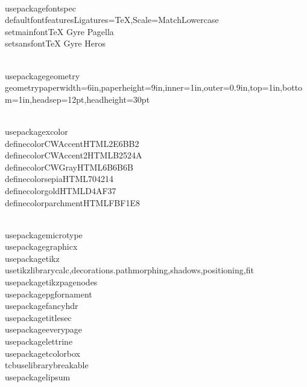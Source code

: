 
\\usepackage{fontspec}
\\defaultfontfeatures{Ligatures=TeX,Scale=MatchLowercase}
\\setmainfont{TeX Gyre Pagella}
\\setsansfont{TeX Gyre Heros}

\\usepackage{geometry}
\\geometry{paperwidth=6in,paperheight=9in,inner=1in,outer=0.9in,top=1in,bottom=1in,headsep=12pt,headheight=30pt}

\\usepackage{xcolor}
\\definecolor{CWAccent}{HTML}{2E6BB2}
\\definecolor{CWAccent2}{HTML}{B2524A}
\\definecolor{CWGray}{HTML}{6B6B6B}
\\definecolor{sepia}{HTML}{704214}
\\definecolor{gold}{HTML}{D4AF37}
\\definecolor{parchment}{HTML}{FBF1E8}

\\usepackage{microtype}
\\usepackage{graphicx}
\\usepackage{tikz}
\\usetikzlibrary{calc,decorations.pathmorphing,shadows,positioning,fit}
\\usepackage{tikzpagenodes}
\\usepackage{pgfornament}
\\usepackage{fancyhdr}
\\usepackage{titlesec}
\\usepackage{everypage}
\\usepackage{lettrine}
\\usepackage{tcolorbox}
\\tcbuselibrary{breakable}
\\usepackage{lipsum} %

